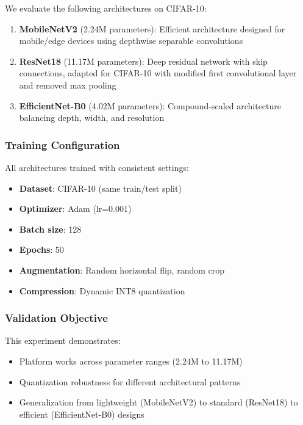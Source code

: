 We evaluate the following architectures on CIFAR-10:

\begin{enumerate}
\item \textbf{MobileNetV2} (2.24M parameters): Efficient architecture designed for mobile/edge devices using depthwise separable convolutions

\item \textbf{ResNet18} (11.17M parameters): Deep residual network with skip connections, adapted for CIFAR-10 with modified first convolutional layer and removed max pooling

\item \textbf{EfficientNet-B0} (4.02M parameters): Compound-scaled architecture balancing depth, width, and resolution
\end{enumerate}

\subsubsection{Training Configuration}

All architectures trained with consistent settings:
\begin{itemize}
\item \textbf{Dataset}: CIFAR-10 (same train/test split)
\item \textbf{Optimizer}: Adam (lr=0.001)
\item \textbf{Batch size}: 128
\item \textbf{Epochs}: 50
\item \textbf{Augmentation}: Random horizontal flip, random crop
\item \textbf{Compression}: Dynamic INT8 quantization
\end{itemize}

\subsubsection{Validation Objective}

This experiment demonstrates:
\begin{itemize}
\item Platform works across parameter ranges (2.24M to 11.17M)
\item Quantization robustness for different architectural patterns
\item Generalization from lightweight (MobileNetV2) to standard (ResNet18) to efficient (EfficientNet-B0) designs
\end{itemize}
